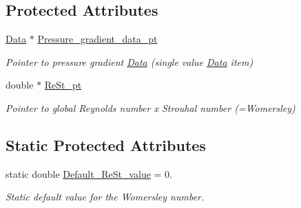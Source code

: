 \subsection*{Protected Attributes}
\begin{DoxyCompactItemize}
\item 
\hyperlink{classoomph_1_1Data}{Data} $\ast$ \hyperlink{classoomph_1_1WomersleyEquations_acf9f462d481937ec282ccb48c34e77bc}{Pressure\+\_\+gradient\+\_\+data\+\_\+pt}
\begin{DoxyCompactList}\small\item\em Pointer to pressure gradient \hyperlink{classoomph_1_1Data}{Data} (single value \hyperlink{classoomph_1_1Data}{Data} item) \end{DoxyCompactList}\item 
double $\ast$ \hyperlink{classoomph_1_1WomersleyEquations_af6aa8745284573bf740816c394fa5437}{Re\+St\+\_\+pt}
\begin{DoxyCompactList}\small\item\em Pointer to global Reynolds number x Strouhal number (=Womersley) \end{DoxyCompactList}\end{DoxyCompactItemize}
\subsection*{Static Protected Attributes}
\begin{DoxyCompactItemize}
\item 
static double \hyperlink{classoomph_1_1WomersleyEquations_a9f25fbad09d6e3b14971755ea81f0189}{Default\+\_\+\+Re\+St\+\_\+value} = 0.
\begin{DoxyCompactList}\small\item\em Static default value for the Womersley number. \end{DoxyCompactList}\end{DoxyCompactItemize}
